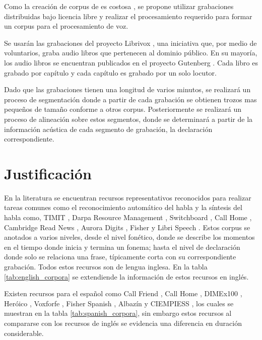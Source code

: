 Como la creación de corpus de es costosa \cite{googleTTSLatinAmericanSpanishCorpus}, se propone utilizar grabaciones distribuidas bajo licencia libre y realizar el procesamiento requerido para formar un corpus para el procesamiento de voz.

Se usarán las grabaciones del proyecto Librivox \cite{LibriVox}, una iniciativa que, por medio de voluntarios, graba audio libros que pertenecen al dominio público. En su mayoría, los audio libros se encuentran publicados en el proyecto Gutenberg \cite{gutenberg}. Cada libro es grabado por capítulo y cada capítulo es grabado por un solo locutor.

Dado que las grabaciones tienen una longitud de varios minutos, se realizará un proceso de segmentación donde a partir de cada grabación se obtienen trozos mas pequeños de tamaño conforme a otros corpus. Posteriormente se realizará un proceso de alineación sobre estos segmentos, donde se determinará a partir de la información acústica de cada segmento de grabación, la declaración correspondiente.


\section{Justificación}

En la literatura se encuentran recursos representativos reconocidos para realizar tareas comunes como el reconocimiento automático del habla y la síntesis del habla como, TIMIT \cite{PriceTheRecognition}, Darpa Resource Management \cite{Lucke1992ExpandingCorpus}, Switchboard \cite{Godfrey1992SWITCHBOARD:Development}, Call Home  \cite{Fu-HuaLiuSpeechCorpus},  Cambridge Read News \cite{RobinsonWSJCAM0:RECOGNITION}, Aurora Digits \cite{EvansEfficientCorpus}, Fisher \cite{CieriTheSpeech-to-Text} y Libri Speech \cite{LIBRISPEECH}. Estos corpus se anotados a varios niveles, desde el nivel fonético, donde se describe los momentos en el tiempo donde inicia y termina un fonema; hasta el nivel de declaración donde solo se relaciona una frase, típicamente corta con su correspondiente grabación. Todos estos recursos son de lengua inglesa. En la tabla \ref{tab:english_corpora} se extendiende la información de estos recursos en inglés.



Existen recursos para el español como Call Friend \cite{CALLFRIENDSpa}, Call Home \cite{CALLHOMESpa}, DIMEx100 \cite{Pineda2004DIMEx100:Spanish}, Heróico \cite{heroico}, Voxforfe \cite{Voxforge.org}, Fisher Spanish \cite{FischerSpa}, Albazín \cite{CampilloAlbayzinEvaluation} y CIEMPIESS \cite{Hernandez-MenaCIEMPIESS:Corpus}, los cuales se muestran en la tabla \ref{tab:spanish_corpora}, sin embargo estos recursos al compararse con los recursos de inglés se evidencia una diferencia en duración considerable.

